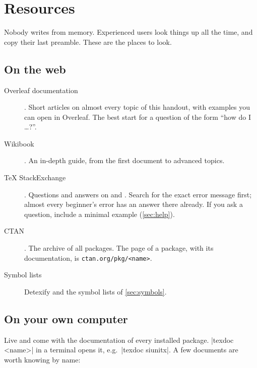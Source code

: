 \chapter{Resources}\label{chap:resources}

Nobody writes  from memory.
Experienced users look things up all the time, and copy their last preamble.
These are the places to look.

\section{On the web}\label{sec:web-resources}

\begin{description}
    \item[Overleaf documentation] .
        Short articles on almost every topic of this handout, with examples you can open in Overleaf.
        The best start for a question of the form \enquote{how do I \ldots?}.
    \item[ Wikibook] .
        An in-depth guide, from the first document to advanced topics.
    \item[TeX StackExchange] .
        Questions and answers on  and .
        Search for the exact error message first; almost every beginner's error has an answer there already.
        If you ask a question, include a minimal example (\autoref{sec:help}).
    \item[CTAN] .
        The archive of all packages.
        The page of a package, with its documentation, is \texttt{ctan.org/pkg/<name>}.
    \item[Symbol lists] Detexify and the symbol lists of \autoref{sec:symbols}.
\end{description}

\section{On your own computer}\label{sec:texdoc}

 Live and  come with the documentation of every installed package.
\code|texdoc <name>| in a terminal opens it, e.g.\ \code|texdoc siunitx|.
A few documents are worth knowing by name:

